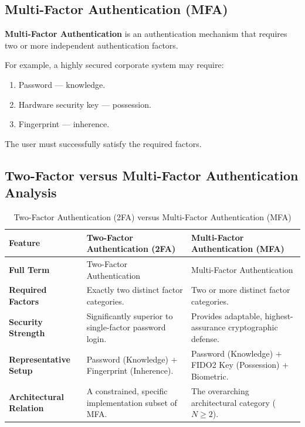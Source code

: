 \subsection{Multi-Factor Authentication (MFA)}

\textbf{Multi-Factor Authentication} is an authentication mechanism that requires two or more independent authentication factors.

For example, a highly secured corporate system may require:

\begin{enumerate}
\item Password --- knowledge.
\item Hardware security key --- possession.
\item Fingerprint --- inherence.
\end{enumerate}

The user must successfully satisfy the required factors.

\subsection{Two-Factor versus Multi-Factor Authentication Analysis}

\begin{table}[htbp]
\centering
\caption{Two-Factor Authentication (2FA) versus Multi-Factor Authentication (MFA)}
\label{tab:2fa_vs_mfa}
\begin{tabularx}{\textwidth}{p{3.2cm} p{5.2cm} X}
\toprule
\textbf{Feature} & \textbf{Two-Factor Authentication (2FA)} & \textbf{Multi-Factor Authentication (MFA)} \\
\midrule
\textbf{Full Term} & Two-Factor Authentication & Multi-Factor Authentication \\
\textbf{Required Factors} & Exactly two distinct factor categories. & Two or more distinct factor categories. \\
\textbf{Security Strength} & Significantly superior to single-factor password login. & Provides adaptable, highest-assurance cryptographic defense. \\
\textbf{Representative Setup} & Password (Knowledge) $+$ Fingerprint (Inherence). & Password (Knowledge) $+$ FIDO2 Key (Possession) $+$ Biometric. \\
\textbf{Architectural Relation} & A constrained, specific implementation subset of MFA. & The overarching architectural category ($N \ge 2$). \\
\bottomrule
\end{tabularx}
\end{table}


